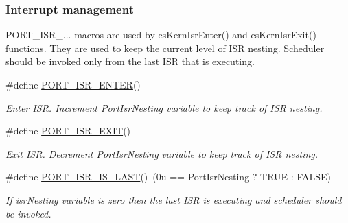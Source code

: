 \subsubsection*{Interrupt management}
\label{_amgrp0762f598cbb5b37886374004ead985d4}%
P\-O\-R\-T\-\_\-\-I\-S\-R\-\_\-... macros are used by es\-Kern\-Isr\-Enter() and es\-Kern\-Isr\-Exit() functions. They are used to keep the current level of I\-S\-R nesting. Scheduler should be invoked only from the last I\-S\-R that is executing. \begin{DoxyCompactItemize}
\item 
\#define \hyperlink{group__template__cpu__intf_gaccad9298c874b29753b318d4f900cb75}{P\-O\-R\-T\-\_\-\-I\-S\-R\-\_\-\-E\-N\-T\-E\-R}()
\begin{DoxyCompactList}\small\item\em Enter I\-S\-R. Increment Port\-Isr\-Nesting variable to keep track of I\-S\-R nesting. \end{DoxyCompactList}\item 
\#define \hyperlink{group__template__cpu__intf_ga267c312d7321e9361b454f4274bbc087}{P\-O\-R\-T\-\_\-\-I\-S\-R\-\_\-\-E\-X\-I\-T}()
\begin{DoxyCompactList}\small\item\em Exit I\-S\-R. Decrement Port\-Isr\-Nesting variable to keep track of I\-S\-R nesting. \end{DoxyCompactList}\item 
\#define \hyperlink{group__template__cpu__intf_ga6c0ea20c8e1f6b9751f51916da8e2aee}{P\-O\-R\-T\-\_\-\-I\-S\-R\-\_\-\-I\-S\-\_\-\-L\-A\-S\-T}()~(0u == Port\-Isr\-Nesting ? T\-R\-U\-E \-: F\-A\-L\-S\-E)
\begin{DoxyCompactList}\small\item\em If isr\-Nesting variable is zero then the last I\-S\-R is executing and scheduler should be invoked. \end{DoxyCompactList}\end{DoxyCompactItemize}
